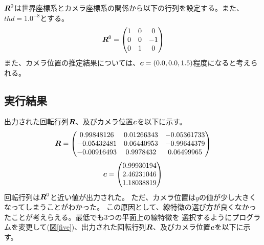 \documentclass[]{jarticle}          %
\begin{document}
$\mbox{\boldmath $R$}^0$は世界座標系とカメラ座標系の関係から以下の行列を設定する。また、$thd=1.0^{-8}$とする。
\begin{equation}
  \mbox{\boldmath $R$}^0 = 
  \begin{pmatrix}
    1 & 0 & 0 \\
    0 & 0 & -1 \\
    0 & 1 & 0 \\
  \end{pmatrix}
\end{equation}
また、カメラ位置の推定結果については、$\mbox{\boldmath $c$}=(0.0, 0.0, 1.5)$程度になると考えられる。
\subsection{実行結果}
出力された回転行列$\mbox{\boldmath $R$}$、及びカメラ位置$\mbox{\boldmath $c$}$を以下に示す。
\begin{equation}
  \mbox{\boldmath $R$} =
  \begin{pmatrix}
    0.99848126 & 0.01266343 & -0.05361733 \\
    -0.05432481 &  0.06440953 & -0.99644379 \\
    -0.00916493 & 0.9978432 & 0.06499965 \\
  \end{pmatrix}
\end{equation}
\begin{equation}
  \mbox{\boldmath $c$} =
  \begin{pmatrix}
    0.99930194 \\
    2.46231046 \\
    1.18038819 \\
  \end{pmatrix}
\end{equation}
回転行列は$\mbox{\boldmath $R$}^0$と近い値が出力された。
ただ、カメラ位置は$y$の値が少し大きくなってしまうことがわかった。
この原因として、線特徴の選び方が良くなかったことが考えらえる。最低でも3つの平面上の線特徴を
選択するようにプログラムを変更して(\hyperref[five]{図\ref{five}})、出力された回転行列$\mbox{\boldmath $R$}$、及びカメラ位置$\mbox{\boldmath $c$}$を以下に示す。
\end{document}
